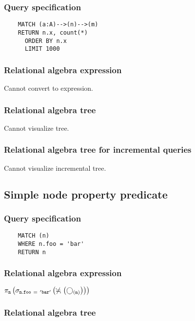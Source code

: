 	\subsubsection*{Query specification}

	\begin{lstlisting}
	MATCH (a:A)-->(n)-->(m)
	RETURN n.x, count(*)
	  ORDER BY n.x
	  LIMIT 1000
	\end{lstlisting}


	\subsubsection*{Relational algebra expression}

	Cannot convert to expression.

	\subsubsection*{Relational algebra tree}

	Cannot visualize tree.

	\subsubsection*{Relational algebra tree for incremental queries}

	Cannot visualize incremental tree.
	\subsection{Simple node property predicate}

	\subsubsection*{Query specification}

	\begin{lstlisting}
	MATCH (n)
	WHERE n.foo = 'bar'
	RETURN n
	\end{lstlisting}


	\subsubsection*{Relational algebra expression}

	$\projection{\var{n}} \left(\selection{\mathtt{n.foo~=~'bar'}} \left(\alldifferent{} \left(\getvertices{n}{}\right)\right)\right)$

	\subsubsection*{Relational algebra tree}

